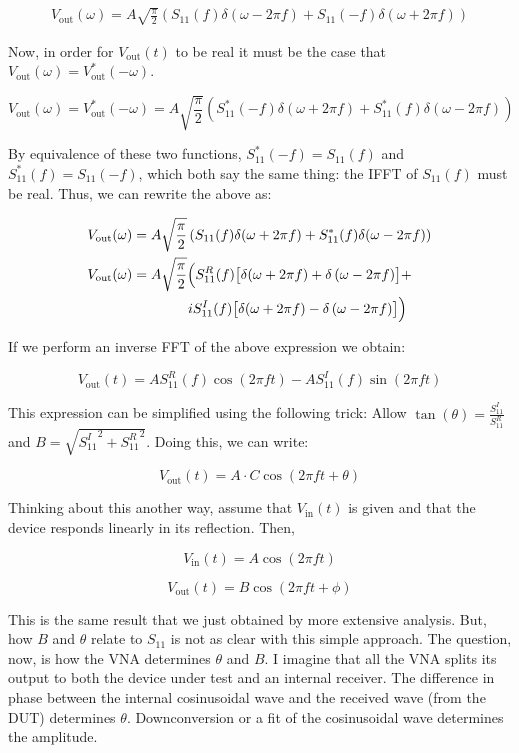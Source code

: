 \begin{align*}
   V_{\text{out}}(\omega) = A \sqrt{\frac{\pi}{2}} \left( S_{11}(f)
   \delta(\omega - 2\pi f) + S_{11}(-f) \delta(\omega + 2\pi f) \right)
\end{align*}

Now, in order for $V_{\text{out}}(t)$ to be real it must be the case that
$ V_{\text{out}}(\omega) = V_{\text{out}}^*(-\omega)$.

\[
   V_{\text{out}}(\omega) = V_{\text{out}}^*(-\omega) = A \sqrt{\frac{\pi}{2}} \left( S_{11}^*(-f)
   \delta(\omega+2\pi f) + S_{11}^*(f) \delta(\omega - 2\pi f) \right)
\]

By equivalence of these two functions, $ S_{11}^*(-f) = S_{11}(f) $ and $
S_{11}^*(f) = S_{11}(-f) $, which both say the same thing: the IFFT of $
S_{11}(f) $ must be real. Thus, we can rewrite the above as:

\begin{align*}
   V_{\text{out}}(\omega) &= A \sqrt{\frac{\pi}{2}} \left( S_{11}(f)
   \delta(\omega+2\pi f) + S_{11}^*(f) \delta(\omega - 2\pi f) \right) \\
   V_{\text{out}}(\omega) &= A \sqrt{\frac{\pi}{2}} \Bigl( S_{11}^R(f)
   \bigl[ \delta (\omega+2\pi f) + \delta\left(\omega - 2\pi f\right) \bigr] + \\
   & \qquad\qquad i S_{11}^I(f) \bigl[ \delta(\omega + 2\pi f) - \delta\left(\omega - 2\pi f\right) \bigr] \Bigr)
\end{align*}

If we perform an inverse FFT of the above expression we obtain:

\[
   V_{\text{out}}(t) = A S_{11}^R(f) \cos(2\pi f t) - A S_{11}^I(f) \sin(2\pi f t)
\]

This expression can be simplified using the following trick: Allow $
\tan(\theta) = \frac{S_{11}^I}{S_{11}^R} $ and $ B = \sqrt{{S_{11}^I}^2 +
{ S_{11}^R }^2} $. Doing this, we can write:

\[
   V_{\text{out}}(t) = A\cdot C \cos(2\pi f t + \theta)
\]

Thinking about this another way, assume that $ V_{\text{in}}(t) $ is given and
that the device responds linearly in its reflection. Then,

\[
   V_{\text{in}}(t) = A \cos(2\pi f t)
\]

\[
   V_{\text{out}}(t) = B \cos(2\pi f t + \phi)
\]

This is the same result that we just obtained by more extensive analysis. But,
how $ B $ and $ \theta $ relate to $ S_{11} $ is not as clear with this simple
approach. The question, now, is how the VNA determines $ \theta $ and $ B $. I
imagine that all the VNA splits its output to both the device under test and an
internal receiver. The difference in phase between the internal cosinusoidal
wave and the received wave (from the DUT) determines $ \theta $. Downconversion
or a fit of the cosinusoidal wave determines the amplitude.

